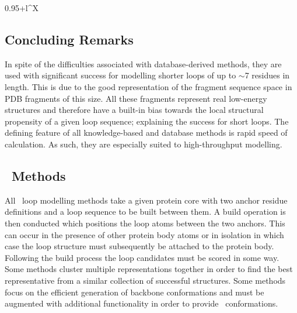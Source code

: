 \begin{table}[hptb]
\begin{center}
\begin{tabularx}{0.95\textwidth}{+l^X}
\bottomrule
\end{tabularx}
\caption{Common knowledge-based scoring methods.}
\label{table:intro:knowledgebasedloop}
\end{center}
\end{table}



\subsection{Concluding Remarks}

In spite of the difficulties associated with  database-derived methods, they are used with significant success for modelling shorter loops of up to $\sim$7 residues in length. This is due to the good representation of the fragment sequence space in PDB fragments of this size. All these fragments represent real low-energy structures and therefore have a built-in bias towards the local structural propensity of a given loop sequence; explaining the success for short loops. The defining
feature of all knowledge-based and database methods is rapid speed of calculation.
As such, they are especially suited to high-throughput modelling.












\subsection{\AbInitio\ Methods}
\label{section:loop:abinitio}

All \abinitio\ loop modelling methods take a given protein core with two anchor residue definitions and a loop sequence to be built between them. A build operation is then conducted which positions the loop atoms between the two anchors. This can occur in the presence of other protein body atoms or in isolation in which case the loop structure must subsequently be attached to the protein body. Following the build process the loop candidates must be scored in some way. Some methods cluster multiple representations together in order to find the best representative from a similar collection of successful structures. Some methods focus on the efficient generation of backbone conformations and must be augmented with additional functionality in order to provide \sidechain\ conformations.


